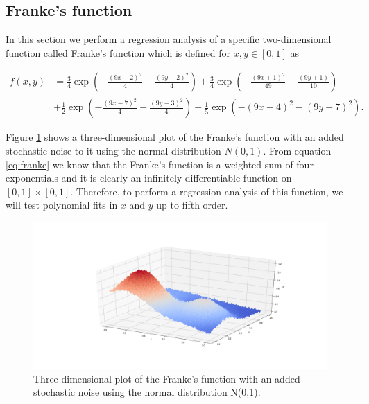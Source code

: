 \documentclass [11pt]{article}
\begin{document}
\subsection{Franke's function}
\label{sebsec:franke}
In this section we perform a regression analysis of a specific two-dimensional function called Franke's
function which is defined for $x,y\in [0,1]$ as

\begin{align}
f(x,y) &= \frac{3}{4}\exp{\left(-\frac{(9x-2)^2}{4} - \frac{(9y-2)^2}{4}\right)}+\frac{3}{4}\exp{\left(-\frac{(9x+1)^2}{49}- \frac{(9y+1)}{10}\right)} \\
&+\frac{1}{2}\exp{\left(-\frac{(9x-7)^2}{4} - \frac{(9y-3)^2}{4}\right)} -\frac{1}{5}\exp{\left(-(9x-4)^2 - (9y-7)^2\right) }.
\label{eq:franke}
\end{align}

Figure \ref{fig:Franke} shows a three-dimensional plot of the Franke's function with an added stochastic noise to it using  the normal distribution $N(0,1)$. From equation \eqref{eq:franke} we know that the Franke's function is a weighted sum of four exponentials and it is clearly an infinitely differentiable function on $[0,1] \times [0,1]$. Therefore, to perform a regression analysis of this function, we will test
polynomial fits in $x$ and $y$ up to fifth order.
\begin{figure}[H]
\centering
\includegraphics[width=1\textwidth]{figures/Franke.png}
        \caption{Three-dimensional plot of the Franke’s function with an added stochastic noise using the normal distribution N(0,1).}
        \label{fig:Franke}
\end{figure}
\end{document}
